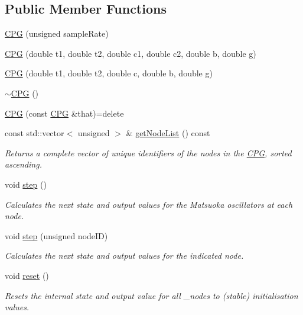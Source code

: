 \subsection*{Public Member Functions}
\begin{DoxyCompactItemize}
\item 
\mbox{\hyperlink{classCPG_a53baf614a79f4178180be5d7120337d4}{C\+PG}} (unsigned sample\+Rate)
\item 
\mbox{\hyperlink{classCPG_a6e797fd36e726758e82cca4207083c5f}{C\+PG}} (double t1, double t2, double c1, double c2, double b, double g)
\item 
\mbox{\hyperlink{classCPG_a8543be2f663d6b5e79a97745f0d83cd7}{C\+PG}} (double t1, double t2, double c, double b, double g)
\item 
\mbox{\hyperlink{classCPG_aa2cac8504168c1b0190ecc4760ef0cbe}{$\sim$\+C\+PG}} ()
\item 
\mbox{\hyperlink{classCPG_a4f5aad687b3696340237e7669efe65b6}{C\+PG}} (const \mbox{\hyperlink{classCPG}{C\+PG}} \&that)=delete
\item 
const std\+::vector$<$ unsigned $>$ \& \mbox{\hyperlink{classCPG_abb0f92255cc444320dab811c031f9e3c}{get\+Node\+List}} () const
\begin{DoxyCompactList}\small\item\em Returns a complete vector of unique identifiers of the nodes in the \mbox{\hyperlink{classCPG}{C\+PG}}, sorted ascending. \end{DoxyCompactList}\item 
void \mbox{\hyperlink{classCPG_a14fdef2f92467c2d7727c9fa0a02a07a}{step}} ()
\begin{DoxyCompactList}\small\item\em Calculates the next state and output values for the Matsuoka oscillators at each node. \end{DoxyCompactList}\item 
void \mbox{\hyperlink{classCPG_ac74c71bc2a70610706b3939673a60b3a}{step}} (unsigned node\+ID)
\begin{DoxyCompactList}\small\item\em Calculates the next state and output values for the indicated node. \end{DoxyCompactList}\item 
void \mbox{\hyperlink{classCPG_ae8f7953090be35f7da520c19ad6825b9}{reset}} ()
\begin{DoxyCompactList}\small\item\em Resets the internal state and output value for all \+\_\+nodes to (stable) initialisation values. \end{DoxyCompactList}\item 

\end{DoxyCompactItemize}
